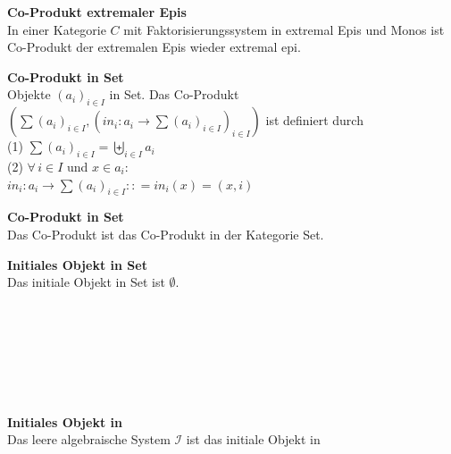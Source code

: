 \begin{multicols}{2}
\textbf{ Co-Produkt extremaler Epis} \\
In einer Kategorie $C$ mit Faktorisierungssystem in extremal Epis und Monos ist Co-Produkt der extremalen Epis wieder extremal epi.

\textbf{ Co-Produkt in Set} \\
Objekte $(a_i)_{i \in I}$ in Set. Das Co-Produkt $\left(\sum(a_{i})_{i\in I},\left(in_{i}:a_{i} \rightarrow \sum (a_{i})_{i\in I}\right)_{i\in I}\right)$ ist definiert durch \\
(1) $\sum(a_{i})_{i\in I}=\biguplus_{i \in I} a_i$\\
(2) $\forall \, i\in I$ und $x\in a_{i} $: \\ $in_i: a_i \rightarrow \sum(a_i)_{i \in I} :: = in_i(x) = (x,i)$

\textbf{ Co-Produkt in Set} \\
Das Co-Produkt ist das Co-Produkt in der Kategorie Set.


\textbf{ Initiales Objekt in Set} \\
Das initiale Objekt in Set ist $\emptyset$.
\\
\\
\\
\\
\\
\\
\\
\\
\textbf{ Initiales Objekt in \syssig} \\
Das leere algebraische System $\mathcal{I}$ ist das initiale Objekt in \syssig



\end{multicols}



